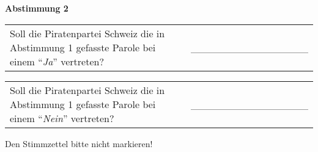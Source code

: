 \documentclass[11pt, a4paper]{scrartcl}
\newcommand{\ja}{\enquote{\textit{Ja}}}
\newcommand{\nein}{\enquote{\textit{Nein}}}
\begin{document}
{\begin{minipage}[t][12.5cm][t]{17.7cm}
\vspace{0.5cm}

\textbf{Abstimmung 2}

\vspace{0.5cm}

\begin{tabular}{ b{13.5cm} b{3cm} }
Soll die Piratenpartei Schweiz die in Abstimmung 1 gefasste Parole bei einem \ja{} vertreten?
& \_\_\_\_\_\_\_\_\_\_\_\_\_\_\_\_ \\
\end{tabular}

\vspace{0.5cm}

\begin{tabular}{ b{13.5cm} b{3cm} }
Soll die Piratenpartei Schweiz die in Abstimmung 1 gefasste Parole bei einem \nein{} vertreten? 
& \_\_\_\_\_\_\_\_\_\_\_\_\_\_\_\_ \\
\end{tabular}

\vspace{0.5cm}

Den Stimmzettel bitte nicht markieren!

\end{minipage}
}
\end{document}
